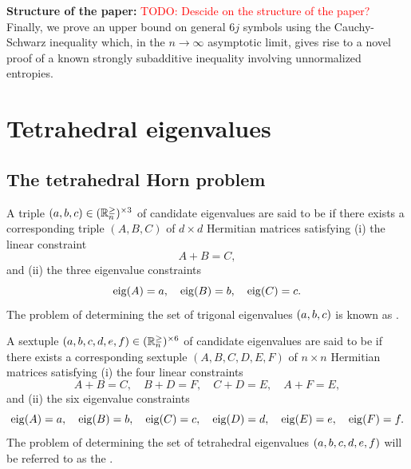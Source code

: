 \documentclass[notitlepage, 10pt]{article}
\begin{document}
\vspace{1em}
\textbf{Structure of the paper:}
\textcolor{red}{TODO: Descide on the structure of the paper?}
Finally, we prove an upper bound on general $6j$ symbols using the Cauchy-Schwarz inequality which, in the $n\to \infty$ asymptotic limit, gives rise to a novel proof of a known strongly subadditive inequality involving unnormalized entropies.

\section{Tetrahedral eigenvalues}
\label{sec:tet_eig}

\subsection{The tetrahedral Horn problem}
\begin{prob}
    \label{prob:tri_problem}
    A triple $(a,b,c) \in (\mathbb R^{\geq}_{n})^{\times 3}$ of candidate eigenvalues are said to be  if there exists a corresponding triple $(A,B,C)$ of $d\times d$ Hermitian matrices satisfying (i) the linear constraint
    \begin{equation}
        \label{eq:tri_linear_constraints}
        A + B = C,
    \end{equation}
    and (ii) the three eigenvalue constraints
    \begin{equation}
        \label{eq:tri_eigenvalue_constraints}
        \operatorname{eig}(A) = a, \quad
        \operatorname{eig}(B) = b, \quad
        \operatorname{eig}(C) = c.
    \end{equation}
    The problem of determining the set of trigonal eigenvalues $(a,b,c)$ is known as .
\end{prob}

\begin{prob}
    \label{prob:tet_problem}
    A sextuple $(a,b,c,d,e,f) \in (\mathbb R^{\geq}_{n})^{\times 6}$ of candidate eigenvalues are said to be  if there exists a corresponding sextuple $(A,B,C,D,E,F)$ of $n\times n$ Hermitian matrices satisfying (i) the four linear constraints
    \begin{equation}
        \label{eq:tet_linear_constraints}
        A + B = C, \quad
        B + D = F, \quad
        C + D = E, \quad
        A + F = E,
    \end{equation}
    and (ii) the six eigenvalue constraints
    \begin{equation}
        \label{eq:tet_eigenvalue_constraints}
        \operatorname{eig}(A) = a, \quad
        \operatorname{eig}(B) = b, \quad
        \operatorname{eig}(C) = c, \quad
        \operatorname{eig}(D) = d, \quad
        \operatorname{eig}(E) = e, \quad
        \operatorname{eig}(F) = f.
    \end{equation}
    The problem of determining the set of tetrahedral eigenvalues $(a,b,c,d,e,f)$ will be referred to as the .
\end{prob}
\end{document}
